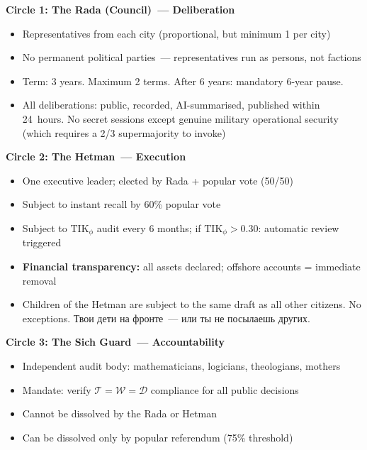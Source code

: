 \documentclass[11pt,a4paper]{article}
\theoremstyle{definition}
\theoremstyle{remark}
\newcommand{\TIKpharisee}{\text{TIK}_{\phi}}    %
\newcommand{\Thought}{\mathcal{T}}
\newcommand{\Word}{\mathcal{W}}
\newcommand{\Deed}{\mathcal{D}}
\newcommand{\IntegrityAxiom}{\Thought = \Word = \Deed}
\begin{document}
\begin{scibox}

\textbf{Circle 1: The Rada (Council)~--- Deliberation}\\
\begin{itemize}[noitemsep]
  \item Representatives from each city
    (proportional, but minimum 1 per city)
  \item No permanent political parties~---
    representatives run as persons, not factions
  \item Term: 3 years. Maximum 2 terms.
    After 6 years: mandatory 6-year pause.
  \item All deliberations: public, recorded, AI-summarised,
    published within 24~hours. No secret sessions
    except genuine military operational security
    (which requires a 2/3 supermajority to invoke)
\end{itemize}

\vspace{0.2cm}
\textbf{Circle 2: The Hetman~--- Execution}\\
\begin{itemize}[noitemsep]
  \item One executive leader; elected by Rada + popular vote (50/50)
  \item Subject to instant recall by 60\% popular vote
  \item Subject to $\TIKpharisee$ audit every 6 months;
    if $\TIKpharisee > 0.30$:
    automatic review triggered
  \item \textbf{Financial transparency:}
    all assets declared; offshore accounts = immediate removal
  \item Children of the Hetman are subject to the same draft
    as all other citizens. No exceptions.
    \foreignlanguage{russian}{
    Твои дети на фронте~--- или ты не посылаешь других.}
\end{itemize}

\vspace{0.2cm}
\textbf{Circle 3: The Sich Guard~--- Accountability}\\
\begin{itemize}[noitemsep]
  \item Independent audit body:
    mathematicians, logicians, theologians, mothers
  \item Mandate: verify $\IntegrityAxiom$ compliance
    for all public decisions
  \item Cannot be dissolved by the Rada or Hetman
  \item Can be dissolved only by popular referendum (75\% threshold)
\end{itemize}
\end{scibox}
\end{document}
